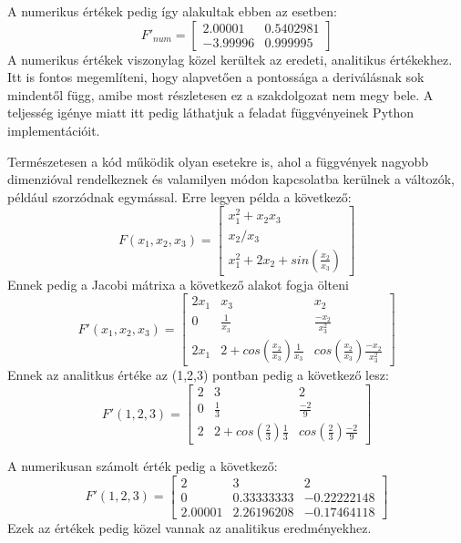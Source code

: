 \documentclass{article}
\theoremstyle{definition}
\theoremstyle{theorem}
\begin{document}
A numerikus értékek pedig így alakultak ebben az esetben:
\begin{equation*}
    F'_{num} = \begin{bmatrix}
        2.00001 & 0.5402981 \\
        -3.99996 & 0.999995
    \end{bmatrix}
\end{equation*}
A numerikus értékek viszonylag közel kerültek az eredeti, analitikus értékekhez.
Itt is fontos megemlíteni, hogy alapvetően a pontossága a deriválásnak sok mindentől függ, amibe most részletesen ez a szakdolgozat nem megy bele. A teljesség igénye miatt itt pedig láthatjuk a feladat függvényeinek Python implementációit.

Természetesen a kód működik olyan esetekre is, ahol a függvények nagyobb dimenzióval rendelkeznek és valamilyen módon kapcsolatba kerülnek a változók, például szorzódnak egymással. Erre legyen példa a következő:
\begin{equation*}
    F(x_1,x_2,x_3) = \begin{bmatrix}
        x_1 ^ 2 + x_2 x_3 \\
        x_2/x_3 \\
        x_1 ^2 + 2 x_2 + sin(\frac{x_2}{x_3})
    \end{bmatrix}
\end{equation*}
 Ennek pedig a Jacobi mátrixa a következő alakot fogja ölteni
 \begin{equation*}
     F'(x_1, x_2, x_3) = \begin{bmatrix}
         2 x_1 & x_3 & x_2 \\
         0 & \frac{1}{x_3} & \frac{-x_2}{x_3^2} \\
         2 x_1 & 2 + cos(\frac{x_2}{x_3}) \frac{1}{x_3} & cos(\frac{x_2}{x_3}) \frac{-x_2}{x_3^2}
     \end{bmatrix}
 \end{equation*}
 Ennek az analitkus értéke az (1,2,3) pontban pedig a következő lesz:
  \begin{equation*}
     F'(1, 2, 3) = \begin{bmatrix}
         2  & 3 & 2 \\
         0 & \frac{1}{3} & \frac{-2}{9} \\
         2  & 2 + cos(\frac{2}{3}) \frac{1}{3}& cos(\frac{2}{3}) \frac{-2}{9}
     \end{bmatrix}
 \end{equation*}

 A numerikusan számolt érték pedig a következő:
\begin{equation*}
     F'(1, 2, 3) = \begin{bmatrix}
         2  & 3 & 2 \\
         0 & 0.33333333 & -0.22222148 \\
         2.00001  & 2.26196208 & -0.17464118
     \end{bmatrix}
\end{equation*}
Ezek az értékek pedig közel vannak az analitikus eredményekhez.
\end{document}
